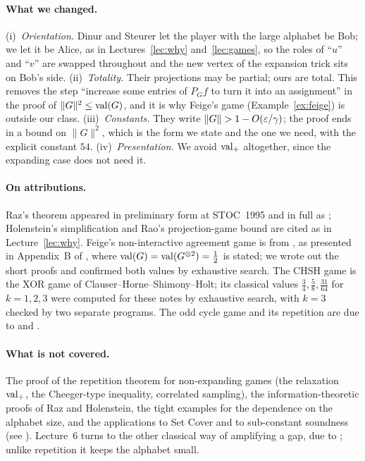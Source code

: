 \paragraph{What we changed.}
(i)~\emph{Orientation.}  Dinur and Steurer let the player with the large alphabet be Bob; we let it be Alice, as in Lectures~\ref{lec:why} and~\ref{lec:games}, so the roles of ``$u$'' and ``$v$'' are swapped throughout and the new vertex of the expansion trick sits on Bob's side.
(ii)~\emph{Totality.}  Their projections may be partial; ours are total.  This removes the step ``increase some entries of $P_Gf$ to turn it into an assignment'' in the proof of $\|G\|^2\le\operatorname{val}(G)$, and it is why Feige's game (Example~\ref{ex:feige}) is outside our class.
(iii)~\emph{Constants.}  They write $\|G\|>1-O(\eps/\gamma)$; the proof ends in a bound on $\|G\|^2$, which is the form we state and the one we need, with the explicit constant $54$.
(iv)~\emph{Presentation.}  We avoid $\operatorname{val}_+$ altogether, since the expanding case does not need it.

\paragraph{On attributions.}
Raz's theorem appeared in preliminary form at STOC~1995 and in full as \citet{Raz98}; Holenstein's simplification and Rao's projection-game bound are cited as in Lecture~\ref{lec:why}.
Feige's non-interactive agreement game is from \citet{Feige91}, as presented in Appendix~B of \citet{DinurSteurer14}, where $\operatorname{val}(G)=\operatorname{val}(G^{\otimes2})=\frac12$ is stated; we wrote out the short proofs and confirmed both values by exhaustive search.
The CHSH game is the XOR game of Clauser--Horne--Shimony--Holt; its classical values $\frac34,\frac58,\frac{31}{64}$ for $k=1,2,3$ were computed for these notes by exhaustive search, with $k=3$ checked by two separate programs.
The odd cycle game and its repetition are due to \citet{FKO07} and \citet{Raz11}.

\paragraph{What is not covered.}
The proof of the repetition theorem for non-expanding games (the relaxation $\operatorname{val}_+$, the Cheeger-type inequality, correlated sampling), the information-theoretic proofs of Raz and Holenstein, the tight examples for the dependence on the alphabet size, and the applications to Set Cover and to sub-constant soundness (see \citealp{DinurSteurer14}).
Lecture~6 turns to the other classical way of amplifying a gap, due to \citet{Dinur07}; unlike repetition it keeps the alphabet small.
